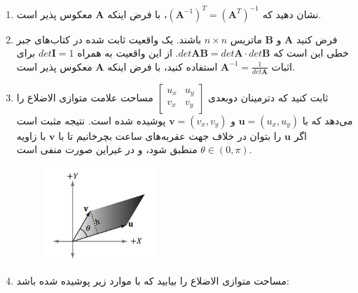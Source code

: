 {\begin{spacing}{1.5}
\begin{enumerate}[label=\textbf{\arabic*}.]
            \item {نشان دهید که $(\textbf{A}^{-1})^{T}=(\textbf{A}^{T})^{-1}$، با فرض اینکه $\textbf{A}$ معکوس پذیر است.}  \\\textbf{\vspace{6pt}}

            \item {فرض کنید $\textbf{A}$ و $\textbf{B}$ ماتریس $n\times n$ باشند.
            یک واقعیت ثابت شده در کتاب‌های جبر خطی این است که $det\textbf{AB}=det\textbf{A}\cdot det\textbf{B}$.
            از این واقعیت به همراه $det\textbf{I}=1$ برای اثبات $\textbf{A}^{-1}=\frac{\displaystyle 1}{\displaystyle det\textbf{A}}$ استفاده کنید،
            با فرض اینکه $\textbf{A}$ معکوس پذیر است.} \\\textbf{\vspace{6pt}}

            \item {ثابت کنید که دترمینان دوبعدی  $\begin{bmatrix}
                                                      u_{x} & u_{y} \\
                                                      v_{x} & v_{y}
            \end{bmatrix}$ مساحت علامت متوازی الاضلاع را می‌دهد که با $\textbf{u}=(u_{x},u_{y})$ و $\textbf{v}=(v_{x},v_{y})$ پوشیده شده است.
            نتیجه مثبت است اگر $\textbf{u}$ را بتوان در خلاف جهت عقربه‌های ساعت بچرخانیم تا با $\textbf{v}$ با زاویه $\theta\in(0,\pi)$ منطبق شود، و در غیر‌این صورت منفی است.
                \begin{figure}[H]
                    \centering
                    \setlength{\belowcaptionskip}{-10pt}
                    \includegraphics[width=0.4\textwidth]{Images/4/2/4.Session.1.2.2}
                    \label{fig:4.Session.1.2.2}
                \end{figure}
            }

            \item {مساحت متوازی الاضلاع را بیابید که با موارد زیر پوشیده شده باشد:
            }


\end{enumerate}
\end{spacing}}
